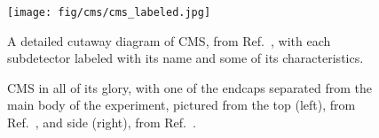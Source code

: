 \begin{figure}[htb]
    \centering
    \texttt{[image: fig/cms/cms\_labeled.jpg]}
    \caption[A detailed cutaway diagram of CMS, with each subdetector labeled.]{
        A detailed cutaway diagram of CMS, from Ref.~\cite{Sakuma:2665537}, with each subdetector labeled with its name and some of its characteristics. 
    }
    \label{fig:cms_labeled}
\end{figure}

\begin{figure}[htb]
    \centering
    \quad
    \caption[CMS with one of the endcaps separated from the main body of the experiment, pictured from the top and side]{
        CMS in all of its glory, with one of the endcaps separated from the main body of the experiment, pictured from the top (left), from Ref.~\cite{Brice:2254952}, and side (right), from Ref.~\cite{Maximilien:1133594}. 
    }
    \label{fig:cms_pics}
\end{figure}

